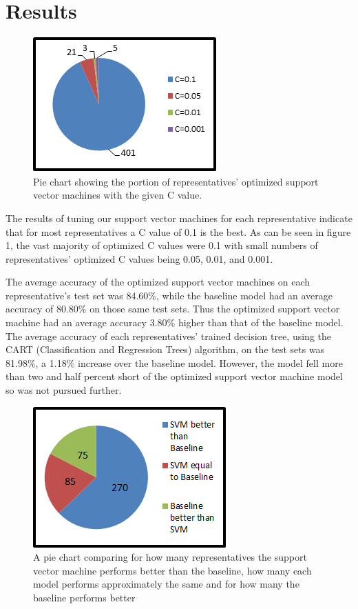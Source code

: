 \documentclass[11pt,letterpaper,twocolumn]{article}
\begin{document}
\section{Results}

\begin{figure}
\centering
\includegraphics{c_values2.png}
\caption{Pie chart showing the portion of representatives' optimized support vector machines with the given C value.}
\end{figure}

The results of tuning our support vector machines for each representative indicate that for most representatives a C value of 0.1 is the best. As can be seen in figure 1, the vast majority of optimized C values were 0.1 with small numbers of representatives' optimized C values being 0.05, 0.01, and 0.001.

The average accuracy of the optimized support vector machines on each representative's test set was 84.60\%, while the baseline model had an average accuracy of 80.80\% on those same test sets. Thus the optimized support vector machine had an average accuracy 3.80\% higher than that of the baseline model. The average accuracy of each representatives' trained decision tree, using the CART (Classification and Regression Trees) algorithm, on the test sets was 81.98\%, a 1.18\% increase over the baseline model. However, the model fell more than two and half percent short of the optimized support vector machine model so was not pursued further.

\begin{figure}
\centering
\includegraphics{pie_chart_12.png}
\caption{A pie chart comparing for how many representatives the support vector machine performs better than the baseline, how many each model performs approximately the same and for how many the baseline performs better}
\end{figure}
\end{document}
